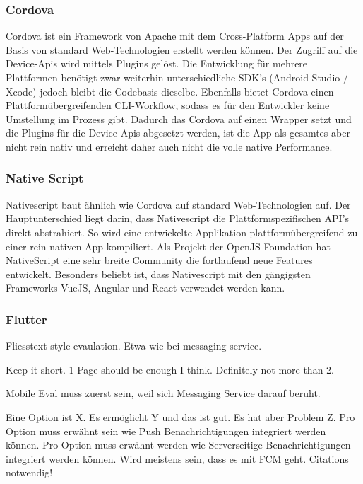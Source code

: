 \subsubsection{Cordova}
Cordova ist ein Framework von Apache mit dem Cross-Platform Apps auf der Basis von standard Web-Technologien erstellt werden können.
Der Zugriff auf die Device-Apis wird mittels Plugins gelöst.
Die Entwicklung für mehrere Plattformen benötigt zwar weiterhin unterschiedliche SDK's (Android Studio / Xcode) jedoch bleibt die Codebasis dieselbe.
Ebenfalls bietet Cordova einen Plattformübergreifenden CLI-Workflow, sodass es für den Entwickler keine Umstellung im Prozess gibt.\cite{cordova-overview}
Dadurch das Cordova auf einen Wrapper setzt und die Plugins für die Device-Apis abgesetzt werden, ist die App als gesamtes aber nicht rein nativ und erreicht daher auch nicht die volle native Performance.\cite{cordova-vs-nativescript}

\subsubsection{Native Script}
Nativescript baut ähnlich wie Cordova auf standard Web-Technologien auf.
Der Hauptunterschied liegt darin, dass Nativescript die Plattformspezifischen API's direkt abstrahiert.
So wird eine entwickelte Applikation plattformübergreifend zu einer rein nativen App kompiliert.
Als Projekt der OpenJS Foundation hat NativeScript eine sehr breite Community die fortlaufend neue Features entwickelt.
Besonders beliebt ist, dass Nativescript mit den gängigsten Frameworks VueJS, Angular und React verwendet werden kann.\cite{ns-core-overview,cordova-vs-nativescript}

\subsubsection{Flutter}



Fliesstext style evaulation. Etwa wie bei messaging service.

Keep it short.
1 Page should be enough I think.
Definitely not more than 2.

Mobile Eval muss zuerst sein, weil sich Messaging Service darauf beruht.

Eine Option ist X. Es ermöglicht Y und das ist gut. Es hat aber Problem Z.
Pro Option muss erwähnt sein wie Push Benachrichtigungen integriert werden können.
Pro Option muss erwähnt werden wie Serverseitige Benachrichtigungen integriert werden können.
Wird meistens sein, dass es mit FCM geht.
Citations notwendig!

